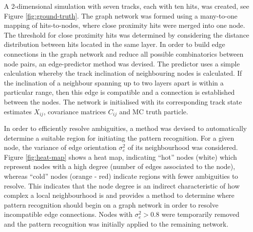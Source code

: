 A 2-dimensional simulation with seven tracks, each with ten hits, was created, see Figure \ref{fig:ground-truth}. The graph network was formed using a many-to-one mapping of hits-to-nodes, where close proximity hits were merged into one node. The threshold for close proximity hits was determined by considering the distance distribution between hits located in the same layer. In order to build edge connections in the graph network and reduce all possible combinatorics between node pairs, an edge-predictor method was devised. The predictor uses a simple calculation whereby the track inclination of neighbouring nodes is calculated. If the inclination of a neighbour spanning up to two layers apart is within a particular range, then this edge is compatible and a connection is established between the nodes. The network is initialised with its corresponding track state estimates $X_{ij}$, covariance matrices $C_{ij}$ and MC truth particle.

In order to efficiently resolve ambiguities, a method was devised to automatically determine a suitable region for initiating the pattern recognition. For a given node, the variance of edge orientation $\sigma_e^2$ of its neighbourhood was considered. Figure \ref{fig:heat-map} shows a heat map, indicating ``hot'' nodes (white) which represent nodes with a high degree (number of edges associated to the node), whereas ``cold'' nodes (orange - red) indicate regions with fewer ambiguities to resolve. This indicates that the node degree is an indirect characteristic of how complex a local neighbourhood is and provides a method to determine where pattern recognition should begin on a graph network in order to resolve incompatible edge connections. Nodes with $\sigma_e^2 > 0.8$ were temporarily removed and the pattern recognition was initially applied to the remaining network.

